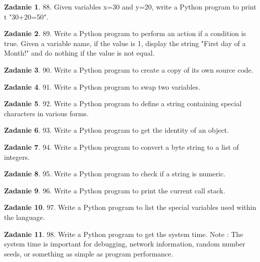 \documentclass[11pt]{article}
\theoremstyle{definition}
\newtheorem{zadanie}{Zadanie}
\begin{document}
\begin{zadanie}
88. Given variables x=30 and y=20, write a Python program to print t "30+20=50".
\end{zadanie}

\begin{zadanie}
89. Write a Python program to perform an action if a condition is true.
Given a variable name, if the value is 1, display the string "First day of a Month!" and do nothing if the value is not equal.
\end{zadanie}

\begin{zadanie}
90. Write a Python program to create a copy of its own source code.
\end{zadanie}

\begin{zadanie}
91. Write a Python program to swap two variables.
\end{zadanie}

\begin{zadanie}
92. Write a Python program to define a string containing special characters in various forms.
\end{zadanie}

\begin{zadanie}
93. Write a Python program to get the identity of an object.
\end{zadanie}

\begin{zadanie}
94. Write a Python program to convert a byte string to a list of integers.
\end{zadanie}

\begin{zadanie}
95. Write a Python program to check if a string is numeric.
\end{zadanie}

\begin{zadanie}
96. Write a Python program to print the current call stack.
\end{zadanie}

\begin{zadanie}
97. Write a Python program to list the special variables used within the language.
\end{zadanie}

\begin{zadanie}
98. Write a Python program to get the system time.
Note : The system time is important for debugging, network information, random number seeds, or something as simple as program performance.
\end{zadanie}
\end{document}
